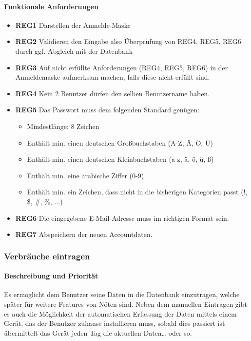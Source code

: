\paragraph{Funktionale Anforderungen}
\begin{itemize}
	\item \textbf{REG1} Darstellen der Anmelde-Maske
	\item \textbf{REG2} Validieren den Eingabe also Überprüfung von REG4, REG5, REG6  durch ggf. Abgleich mit der Datenbank
	\item \textbf{REG3} Auf nicht erfüllte Anforderungen (REG4, REG5, REG6) in der Anmeldemaske aufmerksam machen, falls diese nicht erfüllt sind.
	\item \textbf{REG4} Kein 2 Benutzer dürfen den selben Benutzername haben.
	\item \textbf{REG5} Das Passwort muss dem folgenden Standard genügen:
	      \begin{itemize}
		      \item Mindestlänge: 8 Zeichen
		      \item Enthält min. einen deutschen Großbuchstaben (A-Z, Ä, Ö, Ü)
		      \item Enthält min. einen deutschen Kleinbuchstaben (a-z, ä, ö, ü, ß)
		      \item Enthält min. eine arabische Ziffer (0-9)
		      \item Enthält min. ein Zeichen, dass nicht in die bisherigen Kategorien passt (!, \$, \#, \%, ...)
	      \end{itemize}
	\item \textbf{REG6} Die eingegebene E-Mail-Adresse muss im richtigen Format sein.
	\item \textbf{REG7} Abspeichern der neuen Accountdaten.

\end{itemize}

\subsubsection{Verbräuche eintragen}
\label{sysf:verb_eintragen}
\paragraph{Beschreibung und Priorität}
Es ermöglicht dem Benutzer seine Daten in die Datenbank einzutragen, welche später für weitere Features von Nöten sind. Neben dem manuellen Eintragen gibt es auch die Möglichkeit der automatischen Erfassung der Daten mittels einem Gerät, das der Benutzer zuhause installieren muss, sobald dies passiert ist übermittelt das Gerät jeden Tag die aktuellen Daten… oder so.

